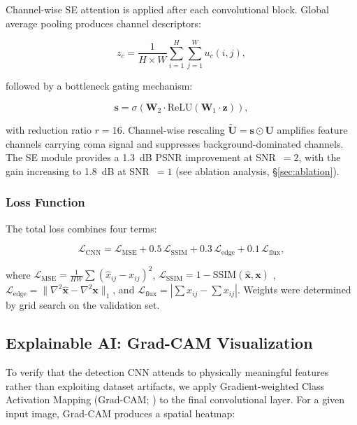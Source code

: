 \documentclass[preprint2]{aastex631}
\begin{document}
Channel-wise SE attention \citep{hu18} is applied after each convolutional block. Global average pooling produces channel descriptors:

\begin{equation}\label{eq:se_squeeze}
z_c = \frac{1}{H \times W} \sum_{i=1}^{H} \sum_{j=1}^{W} u_c(i, j),
\end{equation}

followed by a bottleneck gating mechanism:

\begin{equation}\label{eq:se_excitation}
\mathbf{s} = \sigma\left(\mathbf{W}_2 \cdot \text{ReLU}\left(\mathbf{W}_1 \cdot \mathbf{z}\right)\right),
\end{equation}

with reduction ratio $r=16$. Channel-wise rescaling $\tilde{\mathbf{U}} = \mathbf{s} \odot \mathbf{U}$ amplifies feature channels carrying coma signal and suppresses background-dominated channels. The SE module provides a 1.3~dB PSNR improvement at SNR~$=2$, with the gain increasing to 1.8~dB at SNR~$=1$ (see ablation analysis, \S\ref{sec:ablation}).

\subsubsection{Loss Function}

The total loss combines four terms:

\begin{equation}\label{eq:total_loss}
\mathcal{L}_{\text{CNN}} = \mathcal{L}_{\text{MSE}} + 0.5\,\mathcal{L}_{\text{SSIM}} + 0.3\,\mathcal{L}_{\text{edge}} + 0.1\,\mathcal{L}_{\text{flux}},
\end{equation}

where $\mathcal{L}_{\text{MSE}} = \frac{1}{HW}\sum(\hat{x}_{ij} - x_{ij})^2$, $\mathcal{L}_{\text{SSIM}} = 1 - \text{SSIM}(\hat{\mathbf{x}}, \mathbf{x})$ \citep{wang04}, $\mathcal{L}_{\text{edge}} = \|\nabla^2\hat{\mathbf{x}} - \nabla^2\mathbf{x}\|_1$, and $\mathcal{L}_{\text{flux}} = |\sum\hat{x}_{ij} - \sum x_{ij}|$. Weights were determined by grid search on the validation set.

\subsection{Explainable AI: Grad-CAM Visualization}\label{sec:xai}

To verify that the detection CNN attends to physically meaningful features rather than exploiting dataset artifacts, we apply Gradient-weighted Class Activation Mapping (Grad-CAM; \citealt{selvaraju17}) to the final convolutional layer. For a given input image, Grad-CAM produces a spatial heatmap:
\end{document}
